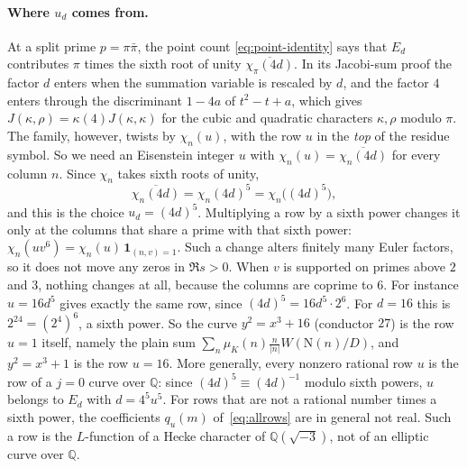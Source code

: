 \documentclass[11pt]{article}
\numberwithin{equation}{section}
\newcommand{\N}{\mathrm N}
\newcommand{\muk}{\mu_K}
\newcommand{\ind}{\mathbf1}
\begin{document}
\paragraph{Where $u_d$ comes from.} At a split prime $p=\pi\bar\pi$, the point count
\eqref{eq:point-identity} says that $E_d$ contributes $\pi$ times the sixth root of unity
$\overline{\chi_\pi(4d)}$. In its Jacobi-sum proof the factor $d$ enters when the summation variable is
rescaled by $d$, and the factor $4$ enters through the discriminant $1-4a$ of $t^2-t+a$, which gives
$J(\kappa,\rho)=\kappa(4)J(\kappa,\kappa)$ for the cubic and quadratic characters $\kappa,\rho$ modulo $\pi$. The
family, however, twists by $\chi_n(u)$, with the row $u$ in the \emph{top} of the residue symbol. So we
need an Eisenstein integer $u$ with $\chi_n(u)=\overline{\chi_n(4d)}$ for every column $n$. Since
$\chi_n$ takes sixth roots of unity,
\begin{equation}\label{eq:d010}
 \overline{\chi_n(4d)}=\chi_n(4d)^5=\chi_n\bigl((4d)^5\bigr),
\end{equation}
and this is the choice $u_d=(4d)^5$. Multiplying a row by a sixth power changes it only at the
columns that share a prime with that sixth power: $\chi_n(uv^6)=\chi_n(u)\,\ind_{(n,v)=1}$. Such a change
alters finitely many Euler factors, so it does not move any zeros in $\Re s>0$. When $v$ is supported on
primes above $2$ and $3$, nothing changes at all, because the columns are coprime to $6$. For instance
$u=16d^5$ gives exactly the same row, since $(4d)^5=16d^5\cdot2^6$.
For $d=16$ this is $2^{24}=(2^4)^6$, a sixth power. So the curve $y^2=x^3+16$ (conductor $27$) is the row
$u=1$ itself, namely the plain sum $\sum_n\muk(n)\frac n{|n|}W(\N(n)/D)$, and $y^2=x^3+1$ is the row $u=16$.
More generally, every nonzero rational row $u$ is the row of a $j=0$ curve over $\mathbb Q$: since
$(4d)^5\equiv(4d)^{-1}$ modulo sixth powers, $u$ belongs to $E_d$ with $d=4^5u^5$. For rows that are not a
rational number times a sixth power, the coefficients $q_u(m)$ of~\eqref{eq:allrows} are in general not real.
Such a row is the $L$-function of a Hecke character of $\mathbb Q(\sqrt{-3})$, not of an elliptic curve over
$\mathbb Q$.
\end{document}
